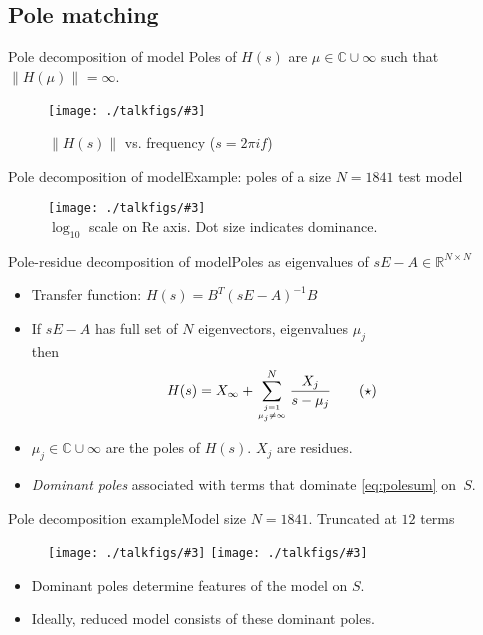 \documentclass{beamer}
\newcommand{\R}{\mathbb{R}}
\newcommand{\C}{\mathbb{C}}
\newcommand{\nrm}[2]{\left\| #2 \right\|_{#1}}
\theoremstyle{remark}
\newcommand{\putfig}[3][{}]{\texttt{[image: ./talkfigs/\#3]}} %
\begin{document}
\subsection{Pole matching}

\begin{frame}{Pole decomposition of model}
Poles of $H(s)$ are $\mu\in\C\cup\infty$ such that $\nrm{}{H(\mu)}=\infty$. 
	\begin{figure}[htbp]
		\centering
			\putfig{.70}{ex1841s1_urm_tfunc.png}
			\caption{$\|H(s)\|$ vs. frequency ($s=2\pi i f$)}
	\end{figure}
\end{frame}



\begin{frame}{Pole decomposition of model}{Example: poles of a size $N=1841$ test model}
	\begin{figure}[htbp]
		\centering
			\putfig[{735 420}]{.90}{ex1841s1_poles_semilog.png}
			\\ $\log_{10}$ scale on Re axis. Dot size indicates dominance.
	\end{figure}
\end{frame}



\begin{frame}{Pole-residue decomposition of model}{Poles as eigenvalues of $sE-A\in\R^{N\times N}$}
	\begin{itemize}
		\item Transfer function: $ H(s)=B^T(sE-A)^{-1}B $
		\smallskip 
		
		\item If  $sE-A$ has full set of $N$ eigenvectors, eigenvalues $\mu_j$\\
	     then  
	     \begin{equation}
	     	H(s)= X_\infty+ \sum_{j=1\atop{\mu_j\neq\infty}}^N \frac{X_j}{s-\mu_j}\tag{$\star$}
	     	\label{eq:polesum}
	     \end{equation}
	    \item $\mu_j\in\C\cup\infty$ are the poles of $H(s)$. $X_j$ are residues.
	    \item \emph{Dominant poles} associated with terms that dominate \eqref{eq:polesum}
	    on~$S$.
	\end{itemize}
\end{frame}




\begin{frame}{Pole decomposition example}{Model size $N=1841$. Truncated at $12$ terms}
	\begin{figure}[htbp]
		\centering
		\putfig{.49}{ex1841s1_urm_10tfunc.png}\hfill
		\putfig{.49}{ex1841s1_10poles.png}
	\end{figure}
	
	\begin{itemize}
		\item Dominant poles determine features of the model on $S$.
		\item Ideally, reduced model consists of these dominant poles.
 	\end{itemize}
\end{frame}
\end{document}
